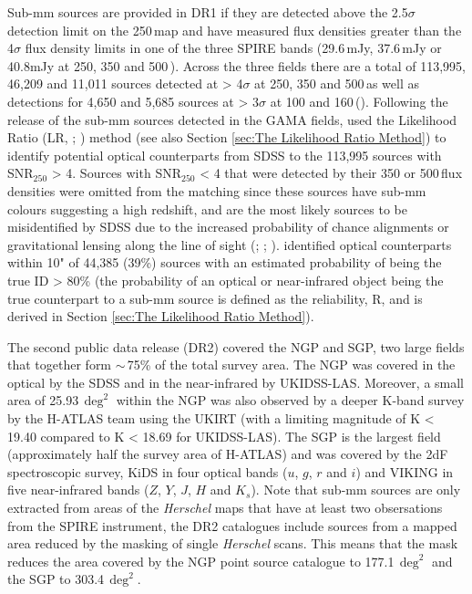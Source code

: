 Sub-mm sources are provided in DR1 if they are detected above the 2.5$\sigma$ detection limit on the 250\,\micron map and have measured flux densities greater than the 4$\sigma$ flux density limits in one of the three SPIRE bands (29.6\,mJy, 37.6\,mJy or 40.8mJy at 250, 350 and 500\,\micron). Across the three fields there are a total of 113,995, 46,209 and 11,011 sources detected at > 4$\sigma$ at 250, 350 and 500\,\micron as well as detections for 4,650 and 5,685 sources at > 3$\sigma$ at 100 and 160\,\micron (\citealt{Valiante_2016}). Following the release of the sub-mm sources detected in the GAMA fields, \citealt{Bourne_2016} used the Likelihood Ratio (LR, \citealt{Sutherland_1992}; \citealt{Ciliegi_2003}) method (see also Section \ref{sec:The Likelihood Ratio Method}) to identify potential optical counterparts from SDSS to the 113,995 sources with SNR$_{250}$ > 4. Sources with SNR$_{250}$ < 4 that were detected by their 350 or 500\,\micron flux densities were omitted from the matching since these sources have sub-mm colours suggesting a high redshift, and are the most likely sources to be misidentified by SDSS due to the increased probability of chance alignments or gravitational lensing along the line of sight (\citealt{Negrello_2010}; \citealt{Pearson_2013}; \citealt{Bourne_2014}). \citealt{Bourne_2016} identified optical counterparts within 10" of 44,385 (39\%) sources with an estimated probability of being the true ID > 80\% (the probability of an optical or near-infrared object being the true counterpart to a sub-mm source is defined as the reliability, R, and is derived in Section \ref{sec:The Likelihood Ratio Method}).

The second public data release (DR2) covered the NGP and SGP, two large fields that together form $\sim$\,75\% of the total survey area. The NGP was covered in the optical by the SDSS and in the near-infrared by UKIDSS-LAS. Moreover, a small area of 25.93\,$\deg^2$ within the NGP was also observed by a deeper K-band survey by the H-ATLAS team using the UKIRT (with a limiting magnitude of K < 19.40 compared to K < 18.69 for UKIDSS-LAS). The SGP is the largest field (approximately half the survey area of H-ATLAS) and was covered by the 2dF spectroscopic survey, KiDS in four optical bands ($u$, $g$, $r$ and $i$) and VIKING in five near-infrared bands ($Z$, $Y$, $J$, $H$ and $K_s$). Note that sub-mm sources are only extracted from areas of the \textit{Herschel} maps that have at least two obsersations from the SPIRE instrument, the DR2 catalogues include sources from a mapped area reduced by the masking of single \textit{Herschel} scans. This means that the mask reduces the area covered by the NGP point source catalogue to 177.1\,$\deg^2$ and the SGP to 303.4\,$\deg^2$. 

